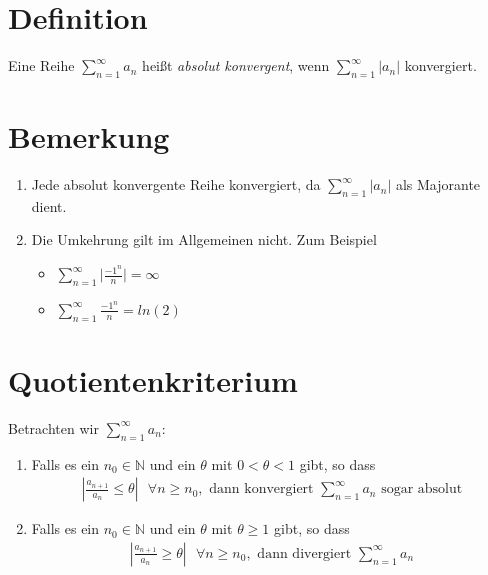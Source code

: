 \documentclass{scrreprt}
\newcommand{\NN}{\mathbb{N}}
\begin{document}
   	\section{Definition}
   	Eine Reihe $\sum\limits_{n = 1}^\infty a_n$ heißt \emph{absolut konvergent}, wenn $\sum\limits_{n = 1}^\infty \vert a_n\vert$ konvergiert.

   	\section{Bemerkung}
   	\begin{enumerate}[1)]
   		\item
   		Jede absolut konvergente Reihe konvergiert, da $\sum_{n = 1}^\infty \vert a_n \vert$ als Majorante dient.
   		\item
   		Die Umkehrung gilt im Allgemeinen nicht. Zum Beispiel
   		\begin{itemize}
   			\item
   			$\sum\limits_{n = 1}^\infty \vert \frac{{-1}^n}{n} \vert = \infty $
   			\item
   			$\sum\limits_{n = 1}^\infty \frac{{-1}^n}{n} = ln(2) $
   		\end{itemize}
   	\end{enumerate}

   	\section{Quotientenkriterium}\label{6.10}
   	Betrachten wir $\sum\limits_{n = 1}^\infty a_n$:
   	\begin{enumerate}
   	\item
   		Falls es ein $n_0 \in \NN$ und ein $\theta$ mit $0 < \theta < 1$ gibt, so dass
   		\begin{align*}
   			\left\vert \frac{a_{n+1}}{a_n} \leq \theta \right\vert ~~~ \forall n \geq n_0, \text{ dann konvergiert $\sum\limits_{n = 1}^\infty a_n$ sogar absolut}
   		\end{align*}
   	\item
   		Falls es ein $n_0 \in \NN$ und ein $\theta$ mit $ \theta \geq 1$ gibt, so dass
   		\begin{align*}
   			\left\vert \frac{a_{n+1}}{a_n} \geq \theta \right\vert ~~~ \forall n \geq n_0, \text{ dann divergiert $\sum\limits_{n = 1}^\infty a_n$}
   		\end{align*}
   	\end{enumerate}
\end{document}
